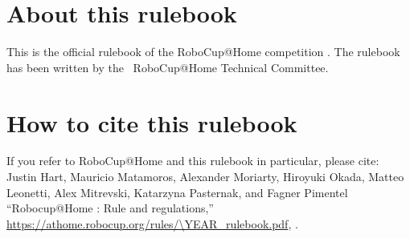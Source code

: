 


\section*{About this rulebook}
This is the official rulebook of the RoboCup@Home competition \YEAR.
The rulebook has been written by the \YEAR ~RoboCup@Home Technical Committee.



\section*{How to cite this rulebook}
If you refer to RoboCup@Home and this rulebook in particular, please cite:\\

\noindent Justin Hart, Mauricio Matamoros, Alexander Moriarty, Hiroyuki Okada,
Matteo Leonetti, Alex Mitrevski, Katarzyna Pasternak, and Fagner Pimentel
\enquote{Robocup@Home \YEAR: Rule and regulations,}
\url{https://athome.robocup.org/rules/\YEAR_rulebook.pdf}, \YEAR.

\begin{center}
\begin{minipage}{0.8\textwidth}
	\footnotesize%
	
\end{minipage}
\end{center}

